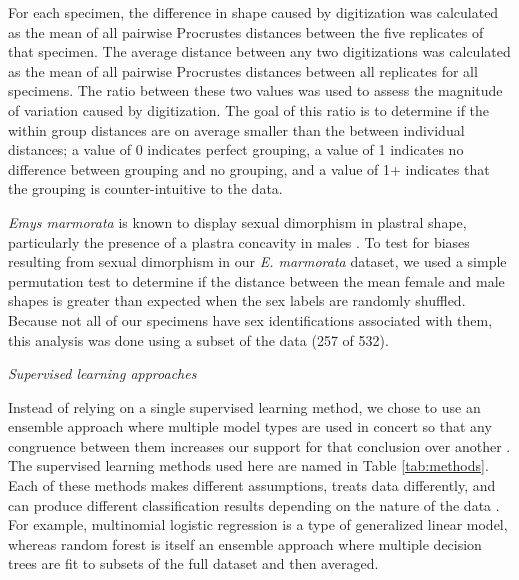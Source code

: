 \documentclass[12pt,letterpaper]{article}
\renewcommand{\subsection}[1]{%
\bigskip
\begin{center}
\begin{large}
\normalfont\itshape #1
\end{large}
\end{center}}
\begin{document}
For each specimen, the difference in shape caused by digitization was calculated as the mean of all pairwise Procrustes distances between the five replicates of that specimen. The average distance between any two digitizations was calculated as the mean of all pairwise Procrustes distances between all replicates for all specimens. The ratio between these two values was used to assess the magnitude of variation caused by digitization. The goal of this ratio is to determine if the within group distances are on average smaller than the between individual distances; a value of 0 indicates perfect grouping, a value of 1 indicates no difference between grouping and no grouping, and a value of 1+ indicates that the grouping is counter-intuitive to the data.

\textit{Emys marmorata} is known to display sexual dimorphism in plastral shape, particularly the presence of a plastra concavity in males \citep{Seeliger1945}. To test for biases resulting from sexual dimorphism in our \textit{E. marmorata} dataset, we used a simple permutation test to determine if the distance between the mean female and male shapes is greater than expected when the sex labels are randomly shuffled. Because not all of our specimens have sex identifications associated with them, this analysis was done using a subset of the data (257 of 532).


\subsection{Supervised learning approaches}
Instead of relying on a single supervised learning method, we chose to use an ensemble approach where multiple model types are used in concert so that any congruence between them increases our support for that conclusion over another \citep{Hastie2009}. The supervised learning methods used here are named in Table \ref{tab:methods}. Each of these methods makes different assumptions, treats data differently, and can produce different classification results depending on the nature of the data \citep{Hastie2009}. For example, multinomial logistic regression is a type of generalized linear model, whereas random forest is itself an ensemble approach where multiple decision trees are fit to subsets of the full dataset and then averaged.
\end{document}
